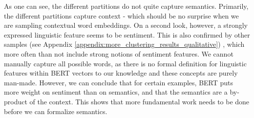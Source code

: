 \documentclass[a4paper,12pt,oneside,openright]{report}
\begin{document}
\begin{tcolorbox}
\label{fig:example_arms_negative_crossed}
\end{tcolorbox}

\quad

As one can see, the different partitions do not quite capture semantics.
Primarily, the different partitions capture context - which should be no surprise when we are sampling contextual word embeddings.
On a second look, however, a strongly expressed linguistic feature seems to be sentiment. 
This is also confirmed by other samples (see Appendix \ref{appendix:more_clustering_results_qualitative}) , which more often than not include strong notions of sentiment features.
We cannot manually capture all possible words, as there is no formal definition for linguistic features within BERT vectors to our knowledge and these concepts are purely man-made. 
However, we can conclude that for certain examples, BERT puts more weight on sentiment than on semantics, and that the semantics are a by-product of the context.
This shows that more fundamental work needs to be done before we can formalize semantics.
\end{document}
